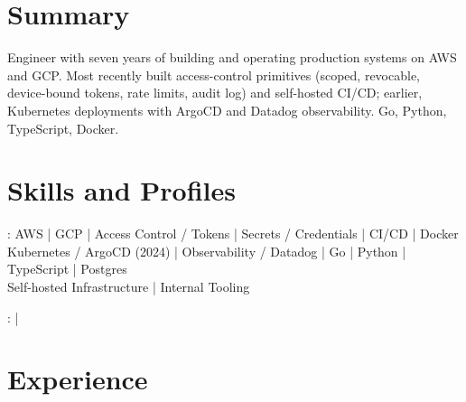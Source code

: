 \documentclass[print]{jack-resume}
\begin{document}
\pagecolor{darkmodeBackground}


\begin{minipage}[t][1cm][t]{.03\textwidth}
    \hfill
\end{minipage}

\section{Summary}
Engineer with seven years of building and operating production systems on AWS and GCP. Most recently built access-control primitives (scoped, revocable, device-bound tokens, rate limits, audit log) and self-hosted CI/CD; earlier, Kubernetes deployments with ArgoCD and Datadog observability. Go, Python, TypeScript, Docker.
\sectionsep

\section{Skills and Profiles}
:
AWS \hfill | \hfill
GCP \hfill | \hfill
Access Control / Tokens \hfill | \hfill
Secrets / Credentials \hfill | \hfill
CI/CD \hfill | \hfill
Docker \\
\hspace{1.0cm} Kubernetes / ArgoCD (2024) \hfill | \hfill
Observability / Datadog \hfill | \hfill
Go \hfill | \hfill
Python \hfill | \hfill
TypeScript \hfill | \hfill
Postgres \\
\hspace{1.0cm} Self-hosted Infrastructure \hfill | \hfill
Internal Tooling \\

\raggedright{
    :
      \href{https://www.linkedin.com/in/jack-sturtevant/}{ \ExternalLink} |
     \href{https://github.com/jacksturt}{ \ExternalLink}}

\section{Experience}
\end{document}
